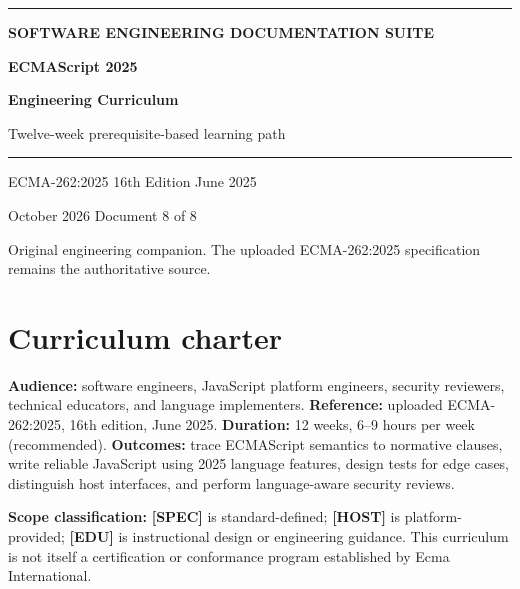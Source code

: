 \documentclass[11pt,letterpaper]{article}
\begin{document}
\hypersetup{pageanchor=false}%
\begin{titlepage}
\thispagestyle{empty}
\vspace*{2.8cm}
{\color{Gold}\rule{18mm}{3pt}}\par\vspace{18mm}
{\sffamily\Large\bfseries\color{Teal} SOFTWARE ENGINEERING DOCUMENTATION SUITE}\par
\vspace{8mm}
{\sffamily\huge\bfseries\color{DeepNavy} ECMAScript 2025 }\par
\vspace{4mm}
{\sffamily\fontsize{24}{29}\selectfont\bfseries\color{DeepNavy} Engineering Curriculum }\par
\vspace{10mm}
{\large\color{Slate} Twelve-week prerequisite-based learning path }\par
\vspace{16mm}
{\color{Teal}\rule{\textwidth}{0.8pt}}\par
\vfill
{\sffamily\color{Slate}\large ECMA-262:2025 \textbullet{} 16th Edition \textbullet{} June 2025}\par
\vspace{3mm}
{\sffamily\color{Slate} October 2026 \textbullet{} Document 8 of 8}\par
\vspace{3mm}
{\small\color{Slate} Original engineering companion. The uploaded ECMA-262:2025 specification remains the authoritative source.}\par
\end{titlepage}\hypersetup{pageanchor=true}
\tableofcontents
\clearpage
\section{Curriculum charter}\label{curriculum-charter}

\textbf{Audience:} software engineers, JavaScript platform engineers, security reviewers, technical educators, and language implementers. \textbf{Reference:} uploaded ECMA-262:2025, 16th edition, June 2025. \textbf{Duration:} 12 weeks, 6--9 hours per week (recommended). \textbf{Outcomes:} trace ECMAScript semantics to normative clauses, write reliable JavaScript using 2025 language features, design tests for edge cases, distinguish host interfaces, and perform language-aware security reviews.

\textbf{Scope classification:} \textbf{{[}SPEC{]}} is standard-defined; \textbf{{[}HOST{]}} is platform-provided; \textbf{{[}EDU{]}} is instructional design or engineering guidance. This curriculum is not itself a certification or conformance program established by Ecma International.
\end{document}

